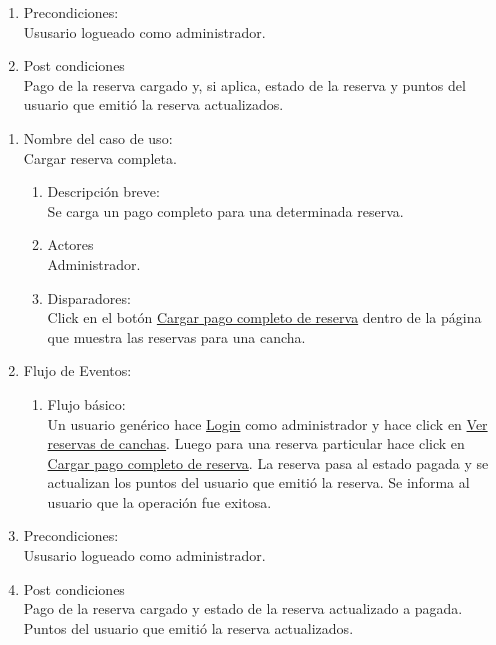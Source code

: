 \documentclass[a4paper,11pt]{article}
\begin{document}
\begin{enumerate}
\begin{enumerate}
    \end{enumerate}

    \item Precondiciones: \\
        Ususario logueado como administrador.

    \item Post condiciones \\
        Pago de la reserva cargado y, si aplica, estado de la reserva y puntos
        del usuario que emitió la reserva actualizados.

\end{enumerate}

\begin{enumerate}

    \item Nombre del caso de uso: \\
    Cargar reserva completa.

    \begin{enumerate}
    \item Descripción breve: \\
        Se carga un pago completo para una determinada reserva.
    \item Actores \\
        Administrador.
    \item Disparadores: \\
        Click en el botón \underline{Cargar pago completo de reserva} dentro de la
        página que muestra las reservas para una cancha.
    \end{enumerate}

    \item Flujo de Eventos: \\

    \begin{enumerate}

        \item Flujo básico:\\
            Un usuario genérico hace \underline{Login} como administrador y
            hace click en \underline{Ver reservas de canchas}. Luego para una
            reserva particular hace click en
            \underline{Cargar pago completo de reserva}. La reserva pasa al
            estado pagada y se actualizan los puntos del usuario que emitió la
            reserva. Se informa al usuario que la operación fue exitosa.

    \end{enumerate}

    \item Precondiciones: \\
        Ususario logueado como administrador.

    \item Post condiciones \\
        Pago de la reserva cargado y estado de la reserva actualizado a pagada.
        Puntos del usuario que emitió la reserva actualizados.

\end{enumerate}
\end{document}
